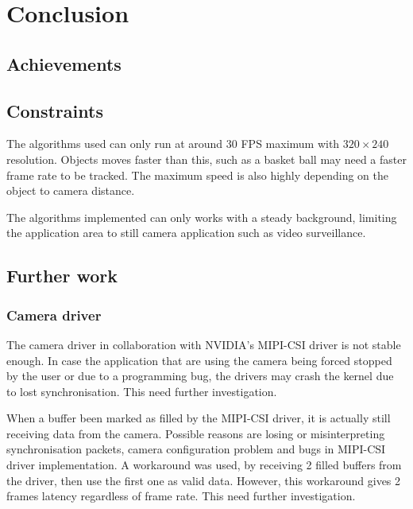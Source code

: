 \chapter{Conclusion} \label{Chapter:Conclusion}

\section{Achievements}


\section{Constraints}

The algorithms used can only run at around 30 FPS maximum with $320 \times 240$ resolution. Objects moves faster than this, such as a basket ball may need a faster frame rate to be tracked. The maximum speed is also highly depending on the object to camera distance.

The algorithms implemented can only works with a steady background, limiting the application area to still camera application such as video surveillance.

\section{Further work}

\subsection{Camera driver}

The camera driver in collaboration with NVIDIA's MIPI-CSI driver is not stable enough. In case the application that are using the camera being forced stopped by the user or due to a programming bug, the drivers may crash the kernel due to lost synchronisation. This need further investigation.

When a buffer been marked as filled by the MIPI-CSI driver, it is actually still receiving data from the camera. Possible reasons are losing or misinterpreting synchronisation packets, camera configuration problem and bugs in MIPI-CSI driver implementation. A workaround was used, by receiving 2 filled buffers from the driver, then use the first one as valid data. However, this workaround gives 2 frames latency regardless of frame rate. This need further investigation.

